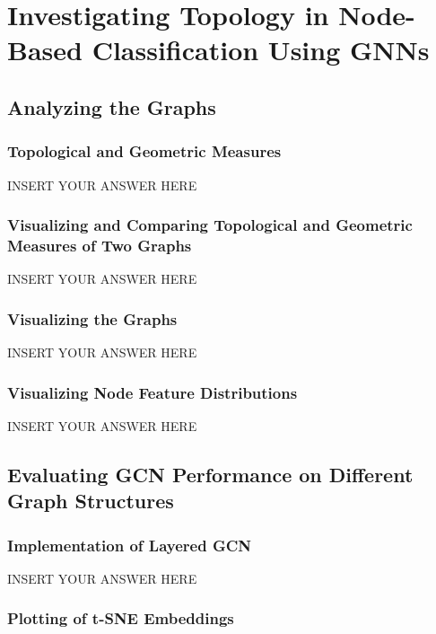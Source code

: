 \documentclass[a4paper,12pt]{article}
\begin{document}
\section{Investigating Topology in Node-Based Classification Using GNNs}\label{sec:topology-node-classification}

\subsection{Analyzing the Graphs}

\subsubsection{Topological and Geometric Measures}

INSERT YOUR ANSWER HERE


\subsubsection{Visualizing and Comparing Topological and Geometric Measures of Two Graphs}

INSERT YOUR ANSWER HERE


\subsubsection{Visualizing the Graphs}

INSERT YOUR ANSWER HERE


\subsubsection{Visualizing Node Feature Distributions}

INSERT YOUR ANSWER HERE


\subsection{Evaluating GCN Performance on Different Graph Structures}

\subsubsection{Implementation of Layered GCN}

INSERT YOUR ANSWER HERE


\subsubsection{Plotting of t-SNE Embeddings}
\end{document}
